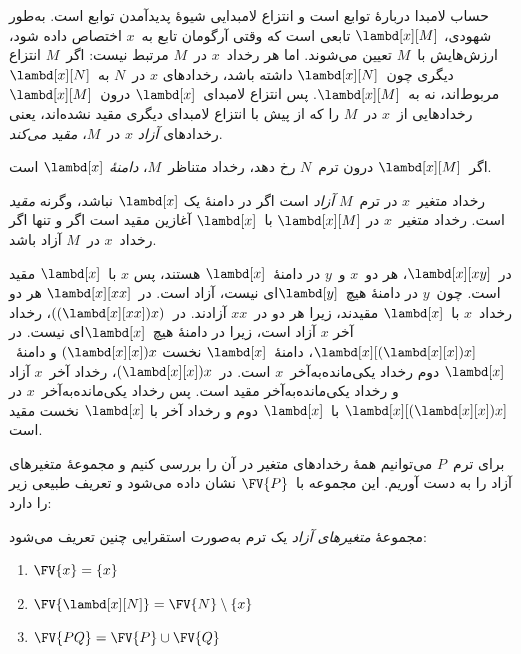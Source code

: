 \documentclass[../../../include/open-logic-section]{subfiles}
\begin{document}

حساب لامبدا دربارهٔ توابع است و انتزاع لامبدایی شیوهٔ پدیدآمدن توابع
است. به‌طور شهودی، $\lambd[x][M]$ تابعی است که وقتی آرگومان تابع به~$x$
اختصاص داده شود، ارزش‌هایش با~$M$ تعیین می‌شوند. اما هر رخداد~$x$ در~$M$
مرتبط نیست: اگر~$M$ انتزاع دیگری چون~$\lambd[x][N]$ داشته باشد، رخدادهای
$x$ در~$N$ به~$\lambd[x][N]$ مربوط‌اند، نه به~$\lambd[x][M]$. پس انتزاع
لامبدای~$\lambd[x]$ درون~$\lambd[x][M]$ رخدادهایی از~$x$ در~$M$ را که
از پیش با انتزاع لامبدای دیگری مقید نشده‌اند، یعنی رخدادهای \emph{آزاد}
$x$ در~$M$، \emph{مقید می‌کند}.

\begin{defn}[دامنه]
اگر~$\lambd[x][M]$ درون ترم~$N$ رخ دهد، رخداد متناظر~$M$، \emph{دامنهٔ}
$\lambd[x]$ است.
\end{defn}


\begin{defn}
  رخداد متغیر~$x$ در ترم~$M$ \emph{آزاد} است اگر در دامنهٔ یک
  $\lambd[x]$ نباشد، وگرنه \emph{مقید} است. رخداد متغیر~$x$ در
  $\lambd[x][M]$ با~$\lambd[x]$ آغازین مقید است اگر و تنها اگر رخداد~$x$
  در~$M$ آزاد باشد.
\end{defn}

\begin{ex}
  در~$\lambd[x][x y]$، هر دو~$x$ و~$y$ در دامنهٔ~$\lambd[x]$ هستند، پس
  $x$ با~$\lambd[x]$ مقید است. چون~$y$ در دامنهٔ هیچ~$\lambd[y]$ای
  نیست، آزاد است. در~$\lambd[x][x x]$ هر دو رخداد~$x$ با~$\lambd[x]$
  مقیدند، زیرا هر دو در~$xx$ آزادند. در~$((\lambd[x][xx])x)$، رخداد آخر
  $x$ آزاد است، زیرا در دامنهٔ هیچ~$\lambd[x]$ای نیست. در
  $\lambd[x][(\lambd[x][x])x]$، دامنهٔ~$\lambd[x]$ نخست
  $(\lambd[x][x])x$ و دامنهٔ~$\lambd[x]$ دوم رخداد یکی‌مانده‌به‌آخر~$x$
  است. در~$(\lambd[x][x])x$، رخداد آخر~$x$ آزاد و رخداد
  یکی‌مانده‌به‌آخر مقید است. پس رخداد یکی‌مانده‌به‌آخر~$x$ در
  $\lambd[x][(\lambd[x][x])x]$ با~$\lambd[x]$ دوم و رخداد آخر با
  $\lambd[x]$ نخست مقید است.
\end{ex}

برای ترم~$P$ می‌توانیم همهٔ رخدادهای متغیر در آن را بررسی کنیم و مجموعهٔ
متغیرهای آزاد را به دست آوریم. این مجموعه با~$\FV{P}$ نشان داده می‌شود
و تعریف طبیعی زیر را دارد:

\begin{defn} 
  مجموعهٔ \emph{متغیرهای آزاد} یک ترم به‌صورت استقرایی چنین تعریف می‌شود:
  \begin{enumerate}
    \item $\FV{x} = \{x\}$ 
    \item $\FV{\lambd[x][N]} = \FV{N} \setminus \{x\}$    
    \item $\FV{PQ} = \FV{P} \cup \FV{Q}$ 
  \end{enumerate}
\end{defn}
\end{document}
